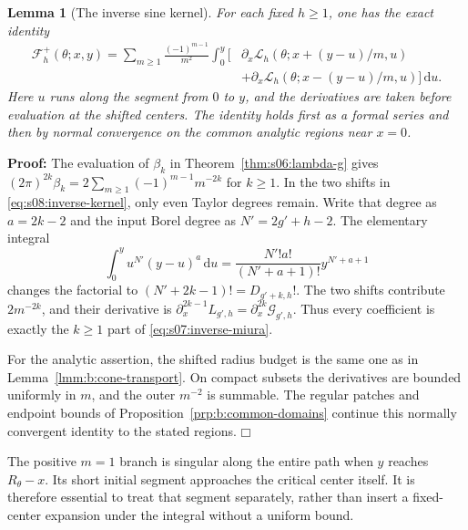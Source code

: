\documentclass[a4paper,10pt]{article}
\numberwithin{equation}{section}
\newcommand{\dd}{\mathrm{d}}
\theoremstyle{paperplain}
\newtheorem{lmm}[thm]{Lemma}
\theoremstyle{paperremark}
\theoremstyle{paperplain}
\newenvironment{prf}{\noindent \textbf{Proof: }}{\hfill $\mdlgwhtsquare$\par\addvspace{0.5\baselineskip}}
\begin{document}
\begin{lmm}[The inverse sine kernel]\label{lmm:s08:inverse-kernel}
For each fixed $h\geq1$, one has the exact identity
\begin{equation}\label{eq:s08:inverse-kernel}
 \begin{aligned}
 \mathcal F_h^+(\theta;x,y)
 =\sum_{m\geq1}\frac{(-1)^{m-1}}{m^2}\int_0^y
 \bigl[&\partial_x\mathcal L_h(\theta;x+(y-u)/m,u)\\
       &+\partial_x\mathcal L_h(\theta;x-(y-u)/m,u)\bigr]\,\dd u.
 \end{aligned}
\end{equation}
Here $u$ runs along the segment from $0$ to $y$, and the derivatives
are taken before evaluation at the shifted centers. The identity
holds first as a formal series and then by normal convergence on
the common analytic regions near $x=0$.
\end{lmm}
\begin{prf}
The evaluation of $\beta_k$ in Theorem~\ref{thm:s06:lambda-g} gives
$(2\pi)^{2k}\beta_k
=2\sum_{m\geq1}(-1)^{m-1}m^{-2k}$ for $k\geq1$.
In the two shifts in \eqref{eq:s08:inverse-kernel}, only even Taylor
degrees remain. Write that degree as $a=2k-2$ and the input Borel
degree as $N'=2g'+h-2$. The elementary integral
\[
 \int_0^y u^{N'}(y-u)^a\,\dd u
       =\frac{N'!a!}{(N'+a+1)!}y^{N'+a+1}
\]
changes the factorial to $(N'+2k-1)!=D_{g'+k,h}!$.
The two shifts contribute $2m^{-2k}$, and their derivative is
$\partial_x^{2k-1}L_{g',h}=\partial_x^{2k}\mathcal G_{g',h}$.
Thus every coefficient is exactly the $k\geq1$ part of
\eqref{eq:s07:inverse-miura}.

For the analytic assertion, the shifted radius budget is the same
one as in Lemma~\ref{lmm:b:cone-transport}. On compact subsets the
derivatives are bounded uniformly in $m$, and the outer $m^{-2}$
is summable. The regular patches and endpoint bounds of
Proposition~\ref{prp:b:common-domains} continue this normally
convergent identity to the stated regions.
\end{prf}

The positive $m=1$ branch is singular along the entire path when
$y$ reaches $R_\theta-x$. Its short initial segment approaches the
critical center itself. It is therefore essential to treat that
segment separately, rather than insert a fixed-center expansion
under the integral without a uniform bound.
\end{document}
